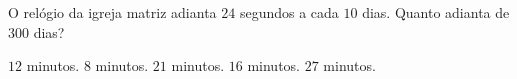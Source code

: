 O relógio da igreja matriz adianta $24$ segundos a cada $10$ dias. Quanto adianta de $300$ dias?

$12$ minutos.
$8$ minutos.
$21$ minutos.
$16$ minutos.
$27$ minutos.



